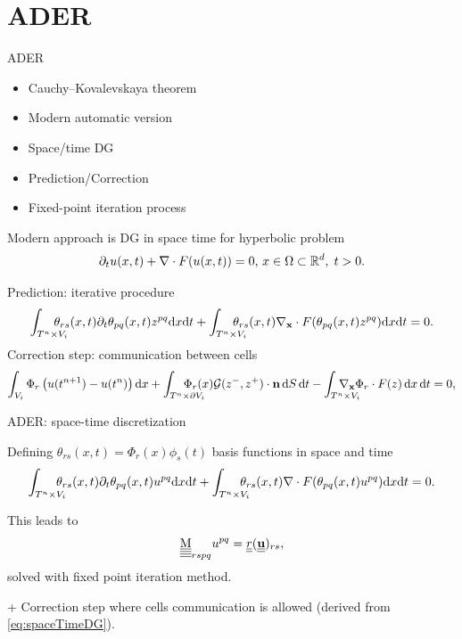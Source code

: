 \documentclass[aspectratio=169]{beamer}
\begin{document}
\section{ADER}
\begin{frame}{ADER}
	\begin{minipage}{0.43\textwidth}
	\begin{itemize}
		\item Cauchy–Kovalevskaya theorem
		\item Modern  automatic version 
		\item Space/time DG
		\item Prediction/Correction
		\item Fixed-point iteration process
	\end{itemize}
\end{minipage}\hfill
\begin{minipage}{0.55\textwidth}
Modern approach is DG in space time for hyperbolic problem
\begin{equation}
	\label{eq:pde}
	\partial_t u(x,t) + \nabla \cdot F(u(x,t)) = 0, \,  x\in \Omega\subset \mathbb{R}^d,\; t>0.
\end{equation}
\end{minipage}

	Prediction: iterative procedure
	\begin{equation*}
		\int_{\STC}\!\!\!\!\!\!\!\! \theta_{rs}(x,t)\partial_t \theta_{pq}(x,t) z^{pq} \diff x \diff t+ \int_{\STC}\!\!\!\!\!\!\!\! \theta_{rs}(x,t) \nabla_{\mathbf{x}} \cdot F(\theta_{pq}(x,t) z^{pq})  \diff x \diff t=0.
	\end{equation*}
	Correction step: communication between cells
	\begin{equation*}
		\int_{\SC} \Phi_r\left( u(t^{n+1})-u(t^n) \right) \dd x + \int_{ \TC\times \partial \SC}\!\!\!\!\!\!\!\! \!\!\!\!\Phi_r(x) \mathcal{G}(z^{-},z^{+}) \cdot \boldsymbol{\mathrm{n}} \, \diff S\, \diff t - \int_{ \STC} \!\!\!\!\!\!\!\!\!\!\!\!\nabla_{\mathbf{x}} \Phi_r \cdot F(z) \, \diff x\, \diff t =0,
	\end{equation*}
	
\end{frame}

\begin{frame}{ADER: space-time discretization}

Defining $\theta_{rs}(x,t) =\Phi_r(x) \phi_s(t)$ basis functions in space and time
\begin{equation}
\int_{\STC}\!\!\!\!\!\! \theta_{rs}(x,t)\partial_t \theta_{pq}(x,t) u^{pq} \diff x \diff t+ \int_{\STC}\!\!\!\!\!\! \theta_{rs}(x,t) \nabla \cdot F(\theta_{pq}(x,t) u^{pq})  \diff x \diff t=0.\label{eq:spaceTimeDG}
\end{equation}
\pause

This leads to
\begin{equation}\label{eq:ADER_DG}
\underline{\underline{\underline{\underline{\mathrm{M}}}}}_{rspq} u^{pq} = \underline{\underline{r}}(\underline{\underline{\mathbf{u}}})_{rs},
\end{equation}
solved with fixed point iteration method.

 +  Correction step where cells communication is allowed (derived from \eqref{eq:spaceTimeDG}). 

\end{frame}
\end{document}
